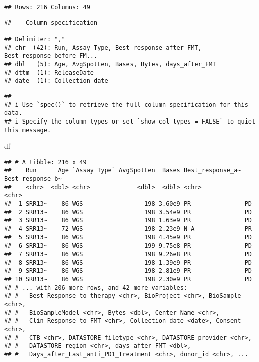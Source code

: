 \documentclass[
]{article}
\newenvironment{Shaded}{\begin{snugshade}}{\end{snugshade}}
\newcommand{\NormalTok}[1]{#1}
\begin{document}
\begin{verbatim}
## Rows: 216 Columns: 49
\end{verbatim}

\begin{verbatim}
## -- Column specification --------------------------------------------------------
## Delimiter: ","
## chr  (42): Run, Assay Type, Best_response_after_FMT, Best_response_before_FM...
## dbl   (5): Age, AvgSpotLen, Bases, Bytes, days_after_FMT
## dttm  (1): ReleaseDate
## date  (1): Collection_date
\end{verbatim}

\begin{verbatim}
## 
## i Use `spec()` to retrieve the full column specification for this data.
## i Specify the column types or set `show_col_types = FALSE` to quiet this message.
\end{verbatim}

\begin{Shaded}
\begin{Highlighting}[]
\NormalTok{df}
\end{Highlighting}
\end{Shaded}

\begin{verbatim}
## # A tibble: 216 x 49
##    Run      Age `Assay Type` AvgSpotLen  Bases Best_response_a~ Best_response_b~
##    <chr>  <dbl> <chr>             <dbl>  <dbl> <chr>            <chr>           
##  1 SRR13~    86 WGS                 198 3.60e9 PR               PD              
##  2 SRR13~    86 WGS                 198 3.54e9 PR               PD              
##  3 SRR13~    86 WGS                 198 1.63e9 PR               PD              
##  4 SRR13~    72 WGS                 198 2.23e9 N_A              PR              
##  5 SRR13~    86 WGS                 198 4.45e9 PR               PD              
##  6 SRR13~    86 WGS                 199 9.75e8 PR               PD              
##  7 SRR13~    86 WGS                 198 9.26e8 PR               PD              
##  8 SRR13~    86 WGS                 198 1.39e9 PR               PD              
##  9 SRR13~    86 WGS                 198 2.81e9 PR               PD              
## 10 SRR13~    86 WGS                 198 2.30e9 PR               PD              
## # ... with 206 more rows, and 42 more variables:
## #   Best_Response_to_therapy <chr>, BioProject <chr>, BioSample <chr>,
## #   BioSampleModel <chr>, Bytes <dbl>, Center Name <chr>,
## #   Clin_Response_to_FMT <chr>, Collection_date <date>, Consent <chr>,
## #   CTB <chr>, DATASTORE filetype <chr>, DATASTORE provider <chr>,
## #   DATASTORE region <chr>, days_after_FMT <dbl>,
## #   Days_after_Last_anti_PD1_Treatment <chr>, donor_id <chr>, ...
\end{verbatim}
\end{document}
